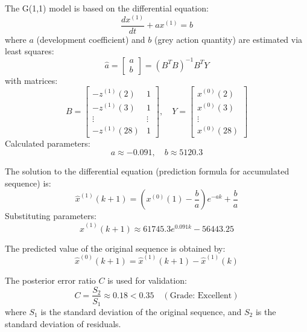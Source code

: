 \documentclass{mcmthesis}
\begin{document}
The G(1,1) model is based on the differential equation:
\begin{equation}
\frac{dx^{(1)}}{dt} + ax^{(1)} = b
\label{eq:differential_equation}
\end{equation}
where \( a \) (development coefficient) and \( b \) (grey action quantity) are estimated via least squares:
\begin{equation}
\hat{a} = \begin{bmatrix} a \\ b \end{bmatrix} = (B^T B)^{-1} B^T Y
\label{eq:parameter_estimation}
\end{equation}
with matrices:
\begin{equation}
B = \begin{bmatrix} -z^{(1)}(2) & 1 \\ -z^{(1)}(3) & 1 \\ \vdots & \vdots \\ -z^{(1)}(28) & 1 \end{bmatrix}, \quad Y = \begin{bmatrix} x^{(0)}(2) \\ x^{(0)}(3) \\ \vdots \\ x^{(0)}(28) \end{bmatrix}
\label{eq:matrices_B_Y}
\end{equation}
Calculated parameters:
\begin{equation}
a \approx -0.091, \quad b \approx 5120.3
\label{eq:calculated_parameters}
\end{equation}

The solution to the differential equation (prediction formula for accumulated sequence) is:
\begin{equation}
\hat{x}^{(1)}(k+1) = \left( x^{(0)}(1) - \frac{b}{a} \right) e^{-ak} + \frac{b}{a}
\label{eq:time_response}
\end{equation}
Substituting parameters:
\begin{equation}
\hat{x}^{(1)}(k+1) \approx 61745.3 e^{0.091k} - 56443.25
\label{eq:time_response_with_params}
\end{equation}

The predicted value of the original sequence is obtained by:
\begin{equation}
\hat{x}^{(0)}(k+1) = \hat{x}^{(1)}(k+1) - \hat{x}^{(1)}(k)
\label{eq:prediction_reduction}
\end{equation}

The posterior error ratio \( C \) is used for validation:
\begin{equation}
C = \frac{S_2}{S_1} \approx 0.18 < 0.35 \quad (\text{Grade: Excellent})
\label{eq:posterior_error}
\end{equation}
where \( S_1 \) is the standard deviation of the original sequence, and \( S_2 \) is the standard deviation of residuals.
\end{document}
